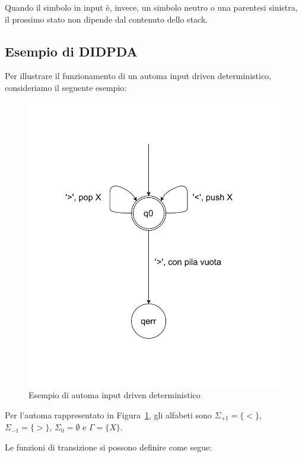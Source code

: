 \documentclass[a4paper,12pt]{report}
\theoremstyle{propositionstyle}
\begin{document}
    Quando il simbolo in input è, invece, un simbolo neutro o una parentesi sinistra, il prossimo stato non dipende dal contenuto dello stack.

    \clearpage
    \subsection{Esempio di DIDPDA}
    
    Per illustrare il funzionamento di un automa input driven deterministico, consideriamo il seguente esempio:
    
    \begin{figure}[H]
        \centering
        \includegraphics[width=4.2\textwidth,height=0.6\textheight,keepaspectratio]{img/automa_det}
        \caption{Esempio di automa input driven deterministico}
        \label{fig:esempio_didpda}
    \end{figure}

    Per l'automa rappresentato in Figura~\ref{fig:esempio_didpda}, gli alfabeti sono $\Sigma_{+1} = \{<\}$, $\Sigma_{-1} = \{>\}$, $\Sigma_0 = \emptyset$ e $\Gamma = \{X\}$.
    
    Le funzioni di transizione si possono definire come segue:
\end{document}
